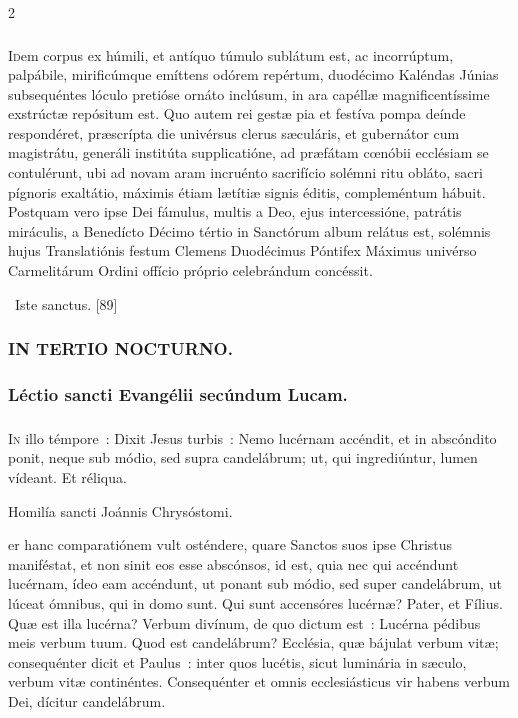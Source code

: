 \documentclass[9pt,twoside]{extarticle}
\begin{document}
\begin{multicols}{2}
\subsubsection*{\center {}}
\lettrine{I}dem corpus ex húmili, et antíquo túmulo sublátum est, ac incorrúptum, palpábile, mirificúmque emíttens odórem repértum, duodécimo Kaléndas Júnias subsequéntes lóculo pretióse ornáto inclúsum, in ara capéllæ magnificentíssime exstrúctæ repósitum est. Quo autem rei gestæ pia et festíva pompa deínde respondéret, præscrípta die univérsus clerus sæculáris, et gubernátor cum magistrátu, generáli institúta supplicatióne, ad præfátam cœnóbii ecclésiam se contulérunt, ubi ad novam aram incruénto sacrifício solémni ritu obláto, sacri pígnoris exaltátio, máximis étiam lætítiæ signis éditis, compleméntum hábuit. Postquam vero ipse Dei fámulus, multis a Deo, ejus intercessióne, patrátis miráculis, a Benedícto Décimo tértio in Sanctórum album relátus est, solémnis hujus Translatiónis festum Clemens Duodécimus Póntifex Máximus univérso Carmelitárum Ordini offício próprio celebrándum concéssit.

\begin{tightlist}{}
\item {}~Iste sanctus. [89]
\end{tightlist}

\subsubsection*{\center \textsc{IN TERTIO NOCTURNO.}}
\subsubsection*{\center Léctio sancti Evangélii secúndum Lucam.}
\subsubsection*{\center {}}
\lettrine{I}n illo témpore~: Dixit Jesus turbis~: Nemo lucérnam accéndit, et in abscóndito ponit, neque sub módio, sed supra candelábrum; ut, qui ingrediúntur, lumen vídeant. Et réliqua.

\begin{center}Homilía sancti Joánnis Chrysóstomi.\\
\end{center}
er hanc comparatiónem vult osténdere, quare Sanctos suos ipse Christus maniféstat, et non sinit eos esse abscónsos, id est, quia nec qui accéndunt lucérnam, ídeo eam accéndunt, ut ponant sub módio, sed super candelábrum, ut lúceat ómnibus, qui in domo sunt. Qui sunt accensóres lucérnæ? Pater, et Fílius. Quæ est illa lucérna? Verbum divínum, de quo dictum est~: Lucérna pédibus meis verbum tuum. Quod est candelábrum? Ecclésia, quæ bájulat verbum vitæ; consequénter dicit et Paulus~: inter quos lucétis, sicut luminária in sæculo, verbum vitæ continéntes. Consequénter et omnis ecclesiásticus vir habens verbum Dei, dícitur candelábrum.


\end{multicols}
\end{document}
